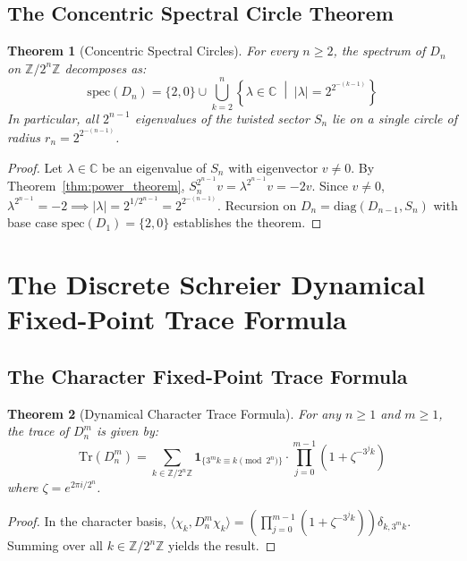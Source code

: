 \documentclass[11pt,reqno]{article}
\theoremstyle{plain}
\newtheorem{theorem}{Theorem}[section]
\theoremstyle{definition}
\theoremstyle{remark}
\newcommand{\Z}{\mathbb{Z}}
\newcommand{\C}{\mathbb{C}}
\newcommand{\Tr}{\mathrm{Tr}}
\newcommand{\spec}{\mathrm{spec}}
\begin{document}
\subsection{The Concentric Spectral Circle Theorem}

\begin{theorem}[Concentric Spectral Circles]
\label{thm:spectral_circles}
For every $n \ge 2$, the spectrum of $D_n$ on $\Z/2^n\Z$ decomposes as:
\[
\spec(D_n) = \{2, 0\} \cup \bigcup_{k=2}^n \left\{ \lambda \in \C \;\middle|\; |\lambda| = 2^{2^{-(k-1)}} \right\}
\]
In particular, all $2^{n-1}$ eigenvalues of the twisted sector $S_n$ lie on a single circle of radius $r_n = 2^{2^{-(n-1)}}$.
\end{theorem}

\begin{proof}
Let $\lambda \in \C$ be an eigenvalue of $S_n$ with eigenvector $v \neq 0$. By Theorem~\ref{thm:power_theorem}, $S_n^{2^{n-1}} v = \lambda^{2^{n-1}} v = -2 v$. Since $v \neq 0$, $\lambda^{2^{n-1}} = -2 \implies |\lambda| = 2^{1 / 2^{n-1}} = 2^{2^{-(n-1)}}$. Recursion on $D_n = \mathrm{diag}(D_{n-1}, S_n)$ with base case $\spec(D_1) = \{2, 0\}$ establishes the theorem.
\end{proof}

\section{The Discrete Schreier Dynamical Fixed-Point Trace Formula}

\subsection{The Character Fixed-Point Trace Formula}

\begin{theorem}[Dynamical Character Trace Formula]
\label{thm:trace_formula}
For any $n \ge 1$ and $m \ge 1$, the trace of $D_n^m$ is given by:
\[
\Tr(D_n^m) = \sum_{k \in \Z/2^n\Z} \mathbf{1}_{\{3^m k \equiv k \pmod{2^n}\}} \cdot \prod_{j=0}^{m-1} \left( 1 + \zeta^{-3^j k} \right)
\]
where $\zeta = e^{2\pi i / 2^n}$.
\end{theorem}

\begin{proof}
In the character basis, $\langle \chi_k, D_n^m \chi_k \rangle = \left( \prod_{j=0}^{m-1} (1 + \zeta^{-3^j k}) \right) \delta_{k, 3^m k}$. Summing over all $k \in \Z/2^n\Z$ yields the result.
\end{proof}
\end{document}
